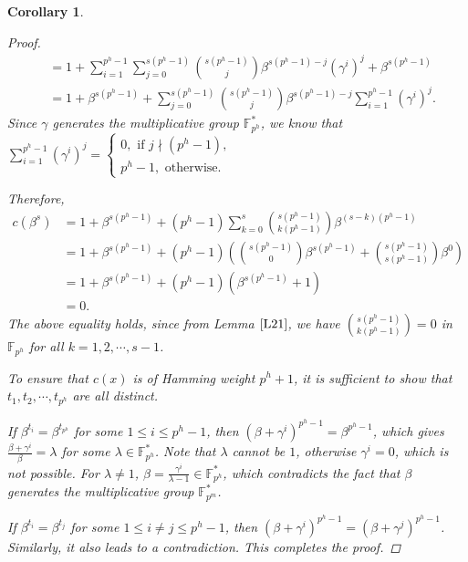 \documentclass[pdflatex,sn-mathphys-num]{sn-jnl}%
\theoremstyle{thmstyleone}%
\newtheorem{corollary}{Corollary}%
\theoremstyle{thmstyletwo}%
\theoremstyle{thmstylethree}%
\begin{document}
\begin{corollary}
\begin{proof}
\begin{align*}
             &= 1+ \sum_{i=1}^{p^h-1}\sum_{j=0}^{s(p^h-1)}\binom{s(p^h-1)}{j}\beta^{s(p^h-1)-j}\left(\gamma^i\right)^{j} +\beta^{s(p^h-1)} \\
             &= 1 + \beta^{s(p^h-1)} + \sum_{j=0}^{s(p^h-1)}\binom{s(p^h-1)}{j}\beta^{s(p^h-1)-j}\sum_{i=1}^{p^h-1}\left(\gamma^i\right)^{j}.
         \end{align*}
         Since $\gamma$ generates the multiplicative group $\mathbb{F}_{p^h}^{*}$, we know that $\sum_{i=1}^{p^h-1}\left(\gamma^i\right)^{j}=\begin{cases}
             0, \text{ if }j\nmid(p^h-1), \\
             p^{h}-1, \text{ otherwise.}
         \end{cases}$
         \par Therefore, 
         \begin{align*}
             c(\beta^s) &= 1 + \beta^{s(p^h-1)} + (p^h-1)\sum_{k=0}^{s}\binom{s(p^h-1)}{k(p^h-1)}\beta^{(s-k)(p^h-1)} \\
             &= 1 + \beta^{s(p^h-1)} + (p^h-1)\left(\binom{s(p^h-1)}{0}\beta^{s(p^h-1)}+\binom{s(p^h-1)}{s(p^h-1)}\beta^{0}\right) \\
             &= 1 + \beta^{s(p^h-1)} + (p^h-1)(\beta^{s(p^h-1)}+1) \\
             &= 0.
         \end{align*}
         The above equality holds, since from Lemma $\ref{L21}$, we have $\binom{s(p^h-1)}{k(p^h-1)}=0$ in $\mathbb{F}_{p^h}$ for all $k=1,2,\cdots,s-1$.
         \par To ensure that $c(x)$ is of Hamming weight $p^h+1$, it is sufficient to show that $t_{1},t_{2},\cdots,t_{p^h}$ are all distinct. 
         \par If $\beta^{t_{i}}=\beta^{t_{p^h}}$ for some $1\leq i\leq p^h-1$, then $(\beta+\gamma^i)^{p^h-1}=\beta^{p^h-1}$, which gives $\frac{\beta+\gamma^i}{\beta}=\lambda$ for some $\lambda\in\mathbb{F}_{p^h}^{*}$. Note that $\lambda$ cannot be $1$, otherwise $\gamma^i=0$, which is not possible. For $\lambda\neq 1$, $\beta=\frac{\gamma^i}{\lambda-1}\in\mathbb{F}_{p^h}^{*}$, which contradicts the fact that $\beta$ generates the multiplicative group $\mathbb{F}_{p^m}^{*}$.  %
         \par If $\beta^{t_{i}}=\beta^{t_{j}}$ for some $1\leq i\neq j\leq p^h-1$, then $(\beta+\gamma^i)^{p^h-1}=(\beta+\gamma^j)^{p^h-1}$. Similarly, it also leads to a contradiction. 
         \vskip 1pt This completes the proof.
    \end{proof}
\end{corollary}
\end{document}
